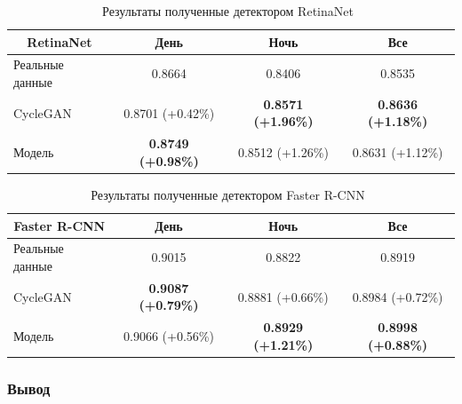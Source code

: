 \documentclass[11pt,a4paper]{extarticle}
\begin{document}
{			\begin{table}[ht]
				\centering
				\begin{tabular}{|l|c|c|c|}
				\hline
				\multicolumn{1}{|c|}{{\color[HTML]{9A0000} \textbf{RetinaNet}}} & \textbf{День}   & \textbf{Ночь}   & \textbf{Все}    \\ \hline
				Реальные данные                                                 & 0.8664          			 & 0.8406         			 & 0.8535          \\ \hline
				CycleGAN                                                        & 0.8701 (+0.42\%)           & \textbf{0.8571 (+1.96\%)} & \textbf{0.8636 (+1.18\%)} \\ \hline
				Модель                                                          & \textbf{0.8749 (+0.98\%)}  & 0.8512 (+1.26\%)          & 0.8631 (+1.12\%)          \\ \hline
				\end{tabular}
				\caption{Результаты полученные детектором RetinaNet~\cite{detector:retina-net}}
				\label{tab:aug:retina-net}
			\end{table}

			\begin{table}[ht]
				\centering
				\begin{tabular}{|l|c|c|c|}
				\hline
				\multicolumn{1}{|c|}{{\color[HTML]{9A0000} \textbf{Faster R-CNN}}} & \textbf{День}             & \textbf{Ночь}             & \textbf{Все}              \\ \hline
				Реальные данные                                                    & 0.9015                    & 0.8822                    & 0.8919                    \\ \hline
				CycleGAN                                                           & \textbf{0.9087 (+0.79\%)} & 0.8881 (+0.66\%)          & 0.8984 (+0.72\%)          \\ \hline
				Модель                                                             & 0.9066 (+0.56\%)          & \textbf{0.8929 (+1.21\%)} & \textbf{0.8998 (+0.88\%)} \\ \hline
				\end{tabular}
				\caption{Результаты полученные детектором Faster R-CNN~\cite{detector:faster-r-cnn}}
				\label{tab:aug:faster-r-cnn}
			\end{table}
			
			\vspace{-2em}
			\subsubsection*{Вывод}
			
}
\end{document}
